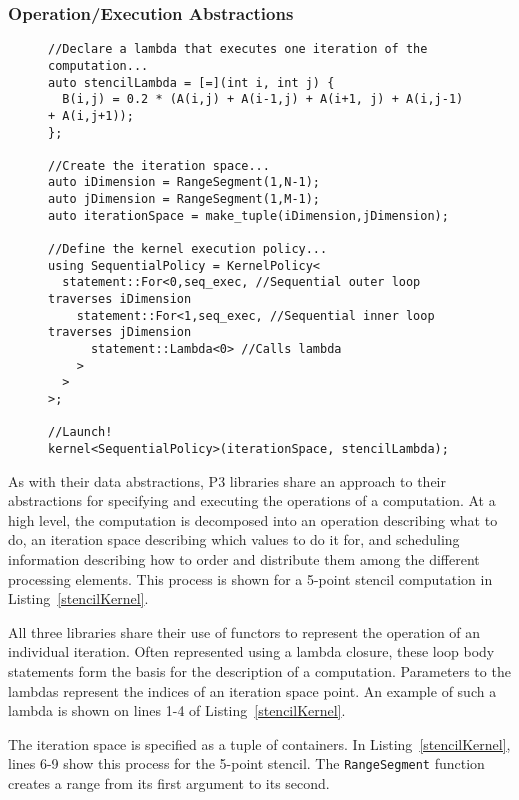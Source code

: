 \subsubsection{Operation/Execution Abstractions}
\begin{figure}
\begin{lstlisting}[caption={Specification of a 5-point stencil kernel using RAJA.}, label=stencilKernel]
//Declare a lambda that executes one iteration of the computation...
auto stencilLambda = [=](int i, int j) {
  B(i,j) = 0.2 * (A(i,j) + A(i-1,j) + A(i+1, j) + A(i,j-1) + A(i,j+1));
};

//Create the iteration space...
auto iDimension = RangeSegment(1,N-1);
auto jDimension = RangeSegment(1,M-1);
auto iterationSpace = make_tuple(iDimension,jDimension);

//Define the kernel execution policy...
using SequentialPolicy = KernelPolicy<
  statement::For<0,seq_exec, //Sequential outer loop traverses iDimension
    statement::For<1,seq_exec, //Sequential inner loop traverses jDimension
      statement::Lambda<0> //Calls lambda
    >
  >
>;

//Launch!
kernel<SequentialPolicy>(iterationSpace, stencilLambda);
\end{lstlisting}
\end{figure}

As with their data abstractions, P3 libraries share an approach to their abstractions for specifying and executing the operations of a computation.
At a high level, the computation is decomposed into an operation describing what to do, an iteration space describing which values to do it for, and scheduling information describing how to order and distribute them among the different processing elements.
This process is shown for a 5-point stencil computation in Listing~\ref{stencilKernel}.

All three libraries share their use of functors to represent the operation of an individual iteration.
Often represented using a lambda closure, these loop body statements form the basis for the description of a computation.
Parameters to the lambdas represent the indices of an iteration space point. 
An example of such a lambda is shown on lines 1-4 of Listing~\ref{stencilKernel}.

The iteration space is specified as a tuple of containers.
In Listing~\ref{stencilKernel}, lines 6-9 show this process for the 5-point stencil. 
The \verb.RangeSegment. function creates a range from its first argument to its second.

